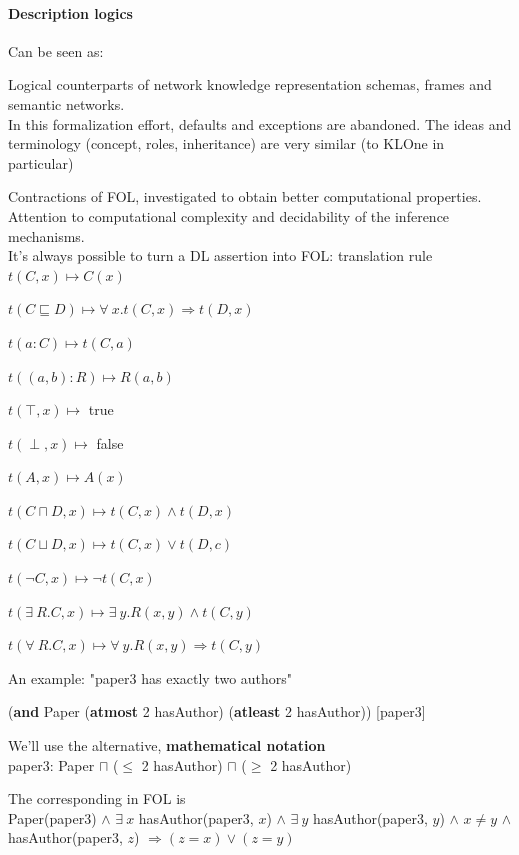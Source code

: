 \documentclass[10pt]{report}
\begin{document}
\paragraph{Description logics} Can be seen as:
\begin{list}{}{}
	\item Logical counterparts of network knowledge representation schemas, frames and semantic networks.\\
	In this formalization effort, defaults and exceptions are abandoned. The ideas and terminology (concept, roles, inheritance) are very similar (to KLOne in particular)
	\item Contractions of FOL, investigated to obtain better computational properties. Attention to computational complexity and decidability of the inference mechanisms.\\
	It's always possible to turn a DL assertion into FOL: translation rule $t(C,x)\mapsto C(x)$
	\begin{multicols}{2}
	\begin{list}{}{}
		\item $t(C\sqsubseteq D)\mapsto \forall\:x.t(C,x)\Rightarrow t(D,x)$
		\item $t(a:C)\mapsto t(C,a)$
		\item $t((a,b):R)\mapsto R(a,b)$
		\item $t(\intercal, x)\mapsto$ true
		\item $t(\perp, x) \mapsto$ false
		\item $t(A,x)\mapsto A(x)$
		\item $t(C \sqcap D, x) \mapsto t(C,x)\wedge t(D,x)$
		\item $t(C \sqcup D, x) \mapsto t(C,x)\vee t(D,c)$
		\item $t(\neg C, x) \mapsto \neg t(C,x)$
		\item $t(\exists\:R.C,x)\mapsto \exists\:y.R(x,y)\wedge t(C,y)$
		\item $t(\forall\:R.C,x)\mapsto \forall\:y.R(x,y)\Rightarrow t(C,y)$
	\end{list}
	\end{multicols}
\end{list}
An example: "paper3 has exactly two authors"
\begin{list}{}{}
	\item (\textbf{and} Paper (\textbf{atmost} 2 hasAuthor) (\textbf{atleast} 2 hasAuthor)) [paper3]
	\item We'll use the alternative, \textbf{mathematical notation}\\
	paper3: Paper $\sqcap$ ($\leq$ 2 hasAuthor) $\sqcap$ ($\geq$ 2 hasAuthor)
	\item The corresponding in FOL is\\
	Paper(paper3) $\wedge$ $\exists\:x$ hasAuthor(paper3, $x$) $\wedge$ $\exists\:y$ hasAuthor(paper3, $y$) $\wedge$ $x\neq y$ $\wedge$ hasAuthor(paper3, $z$) $\Rightarrow (z = x) \vee (z = y)$
\end{list}
\end{document}
